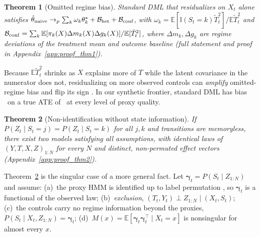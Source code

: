 \documentclass[twoside]{article}
\newtheorem{theorem}{Theorem}
\theoremstyle{definition}
\newcommand{\E}{\mathbb{E}}
\newcommand{\one}{\mathbb{I}}
\newcommand{\bgam}{\boldsymbol{\gamma}}
\begin{document}
\begin{theorem}[Omitted regime bias]
\label{thm:bias}
Standard DML that residualizes on $X_t$ alone satisfies $\hat\theta_{\rm naive}\to_p\sum_k\omega_k\theta_k^*+\mathcal B_{\rm het}+\mathcal B_{\rm conf}$, with $\omega_k=\E[\one(S_t{=}k)\tilde T_t^2]/\E\tilde T_t^2$ and
$\mathcal B_{\rm conf}=\sum_k\E[\pi_k(X)\Delta m_k(X)\Delta g_k(X)]/\E[\tilde T_t^2]$,
where $\Delta m_k,\Delta g_k$ are regime deviations of the treatment mean and outcome baseline (full statement and proof in Appendix~\ref{app:proof_thm1}).
\end{theorem}
Because $\E\tilde T_t^2$ shrinks as $X$ explains more of $T$ while the latent covariance in the numerator does not, residualizing on more observed controls can \emph{amplify} omitted-regime bias and flip its sign \citep{pearl2012bias}. In our synthetic frontier, standard DML has bias \FDStd\ on a true ATE of \FDTrueATE\ at every level of proxy quality.

\begin{theorem}[Non-identification without state information]
\label{thm:impossibility}
If $P(Z_t\mid S_t{=}j)=P(Z_t\mid S_t{=}k)$ for all $j,k$ and transitions are memoryless, there exist two models satisfying all assumptions, with identical laws of $(Y,T,X,Z)_{1:N}$ for every $N$ and distinct, non-permuted effect vectors (Appendix~\ref{app:proof_thm2}).
\end{theorem}
Theorem~\ref{thm:impossibility} is the singular case of a more general fact. Let $\bgam_t=P(S_t\mid Z_{1:N})$ and assume: (a)~the proxy HMM is identified up to label permutation \citep{allman2009identifiability}, so $\bgam_t$ is a functional of the observed law; (b)~\emph{exclusion}, $(T_t,Y_t)\perp Z_{1:N}\mid(X_t,S_t)$; (c)~the controls carry no regime information beyond the proxies, $P(S_t\mid X_t,Z_{1:N})=\bgam_t$; (d)~$M(x)=\E[\bgam_t\bgam_t^\top\mid X_t=x]$ is nonsingular for almost every $x$.
\end{document}
